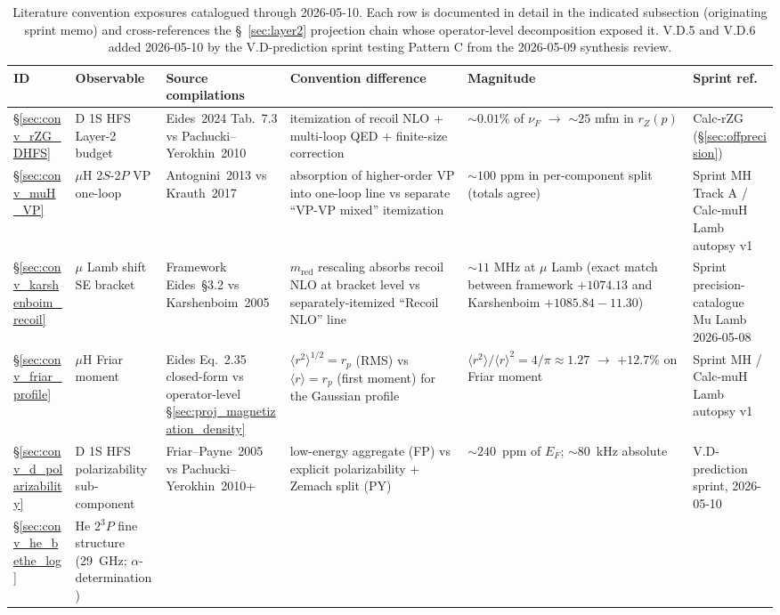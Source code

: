 \documentclass[11pt]{article}
\begin{document}
\begin{table}[h]
\centering\small
\caption{Literature convention exposures catalogued through 2026-05-10.
Each row is documented in detail in the indicated subsection
(originating sprint memo) and cross-references the
\S~\ref{sec:layer2} projection chain whose operator-level
decomposition exposed it.  V.D.5 and V.D.6 added 2026-05-10 by the
V.D-prediction sprint testing Pattern C from the 2026-05-09 synthesis review.}
\label{tab:convention_exposures}
\begin{tabular}{p{0.6cm} p{2.6cm} p{3.0cm} p{2.6cm} p{1.6cm} p{1.6cm}}
\toprule
ID & Observable & Source compilations & Convention difference &
Magnitude & Sprint ref. \\
\midrule
\S\ref{sec:conv_rZG_DHFS} & D 1S HFS Layer-2 budget &
Eides~2024 Tab.~7.3 vs Pachucki--Yerokhin~2010 &
itemization of recoil NLO + multi-loop QED + finite-size correction &
$\sim 0.01\%$ of $\nu_F$ $\to$ $\sim 25$ mfm in $r_Z(p)$ &
Calc-rZG (\S\ref{sec:offprecision}) \\
\S\ref{sec:conv_muH_VP} & $\mu$H 2$S$-2$P$ VP one-loop &
Antognini~2013 vs Krauth~2017 &
absorption of higher-order VP into one-loop line vs separate
``VP-VP mixed'' itemization &
$\sim 100$ ppm in per-component split (totals agree) &
Sprint MH Track A / Calc-muH Lamb autopsy v1 \\
\S\ref{sec:conv_karshenboim_recoil} & $\mu$ Lamb shift SE bracket &
Framework Eides~\S 3.2 vs Karshenboim~2005 &
$m_\text{red}$ rescaling absorbs recoil NLO at bracket level vs
separately-itemized ``Recoil NLO'' line &
$\sim 11$ MHz at $\mu$ Lamb (exact match between framework
$+1074.13$ and Karshenboim $+1085.84 - 11.30$) &
Sprint precision-catalogue Mu Lamb 2026-05-08 \\
\S\ref{sec:conv_friar_profile} & $\mu$H Friar moment &
Eides Eq.~2.35 closed-form vs operator-level
\S\ref{sec:proj_magnetization_density} &
$\langle r^2\rangle^{1/2} = r_p$ (RMS) vs $\langle r\rangle = r_p$
(first moment) for the Gaussian profile &
$\langle r^2\rangle/\langle r\rangle^2 = 4/\pi \approx 1.27$
$\to$ $+12.7\%$ on Friar moment &
Sprint MH / Calc-muH Lamb autopsy v1 \\
\S\ref{sec:conv_d_polarizability} & D 1S HFS polarizability sub-component &
Friar--Payne~2005 vs Pachucki--Yerokhin~2010+ &
low-energy aggregate (FP) vs explicit polarizability $+$ Zemach split (PY) &
$\sim 240$~ppm of $E_F$; $\sim 80$~kHz absolute &
V.D-prediction sprint, 2026-05-10 \\
\S\ref{sec:conv_he_bethe_log} & He $2{}^3P$ fine structure (29~GHz; $\alpha$-determination) &

\end{tabular}
\end{table}
\end{document}
